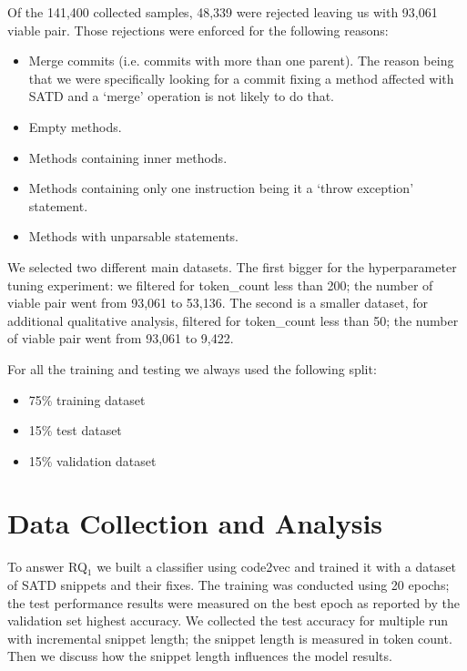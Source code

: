 Of the 141,400 collected samples, 48,339 were rejected leaving us with 93,061 viable pair. Those rejections were enforced for the following reasons:
\begin{itemize}
    \item Merge commits (i.e. commits with more than one parent). The reason being that we were specifically looking for a commit fixing a method affected with SATD and a `merge' operation is not likely to do that.
    \item Empty methods.
    \item Methods containing inner methods.
    \item Methods containing only one instruction being it a `throw exception' statement.
    \item Methods with unparsable statements.
\end{itemize}

We selected two different main datasets. The first bigger for the hyperparameter tuning experiment: we filtered for token\_count less than 200; the number of viable pair went from 93,061 to 53,136. The second is a smaller dataset, for additional qualitative analysis, filtered for token\_count less than 50; the number of viable pair went from 93,061 to 9,422.
% 

For all the training and testing we always used the following split:  
\begin{itemize}
    \item 75\% training dataset
    \item 15\% test dataset
    \item 15\% validation dataset
\end{itemize}

\section{Data Collection and Analysis}



To answer RQ$_1$ we built a classifier using code2vec and trained it with a dataset of SATD snippets and their fixes.
The training was conducted using 20 epochs; the test performance results were measured on the best epoch as reported by the validation set highest accuracy.
We collected the test accuracy for multiple run with incremental snippet length; the snippet length is measured in token count. Then we discuss how the snippet length influences the model results.

